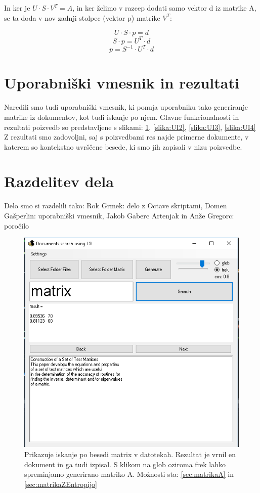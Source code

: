\documentclass{article}
\begin{document}
In ker je \( U \cdot S \cdot V^{T} = A \), in ker želimo v razcep dodati samo vektor d iz matrike A, se ta doda v nov zadnji stolpec (vektor p) matrike \(  V^{T} \):

\[ 
U \cdot S \cdot p = d \]
\[ S \cdot p = U^{T} \cdot d   \]
\[ p = S^{-1} \cdot  U^{T} \cdot d  \]

\section{Uporabniški vmesnik in rezultati}
Naredili smo tudi uporabniški vmesnik, ki ponuja uporabniku tako generiranje matrike iz dokumentov, kot tudi iskanje po njem. Glavne funkcionalnosti in rezultati poizvedb so predstavljene s slikami:  \ref{slika:UI1}, \ref{slika:UI2}, \ref{slika:UI3}, \ref{slika:UI4} \\
Z rezultati smo zadovoljni, saj s poizvedbami res najde primerne dokumente, v katerem so kontekstno uvrščene besede, ki smo jih zapisali v nizu poizvedbe. 


\section{Razdelitev dela}
Delo smo si razdelili tako: Rok Grmek: delo z Octave skriptami, Domen Gašperlin: uporabniški vmesnik, Jakob Gaberc Artenjak in Anže Gregorc: poročilo

\begin{figure}[h]
 \centering
    \includegraphics[width=\linewidth]{UI001}
    \caption{Prikazuje iskanje po besedi matrix v datotekah. Rezultat je vrnil en dokument in ga tudi izpisal. S klikom na glob oziroma frek lahko spreminjamo generirano matriko A. Možnosti sta: \ref{sec:matrikaA} in \ref{sec:matrikaZEntropijo}}
    \label{slika:UI1}
\end{figure}
\end{document}
